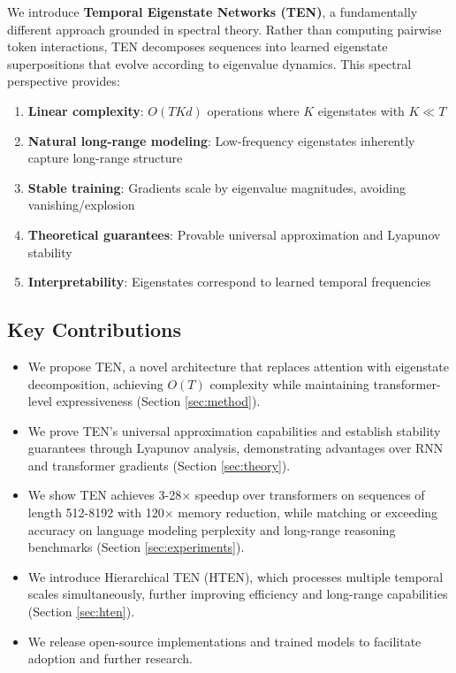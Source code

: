 \documentclass[11pt,letterpaper]{article}
\begin{document}
We introduce \textbf{Temporal Eigenstate Networks (TEN)}, a fundamentally different approach grounded in spectral theory. Rather than computing pairwise token interactions, TEN decomposes sequences into learned eigenstate superpositions that evolve according to eigenvalue dynamics. This spectral perspective provides:

\begin{enumerate}
    \item \textbf{Linear complexity}: $O(TKd)$ operations where $K$ eigenstates with $K \ll T$
    \item \textbf{Natural long-range modeling}: Low-frequency eigenstates inherently capture long-range structure
    \item \textbf{Stable training}: Gradients scale by eigenvalue magnitudes, avoiding vanishing/explosion
    \item \textbf{Theoretical guarantees}: Provable universal approximation and Lyapunov stability
    \item \textbf{Interpretability}: Eigenstates correspond to learned temporal frequencies
\end{enumerate}

\subsection{Key Contributions}

\begin{itemize}
    \item We propose TEN, a novel architecture that replaces attention with eigenstate decomposition, achieving $O(T)$ complexity while maintaining transformer-level expressiveness (Section \ref{sec:method}).
    
    \item We prove TEN's universal approximation capabilities and establish stability guarantees through Lyapunov analysis, demonstrating advantages over RNN and transformer gradients (Section \ref{sec:theory}).
    
    \item We show TEN achieves 3-28× speedup over transformers on sequences of length 512-8192 with 120× memory reduction, while matching or exceeding accuracy on language modeling perplexity and long-range reasoning benchmarks (Section \ref{sec:experiments}).
    
    \item We introduce Hierarchical TEN (HTEN), which processes multiple temporal scales simultaneously, further improving efficiency and long-range capabilities (Section \ref{sec:hten}).
    
    \item We release open-source implementations and trained models to facilitate adoption and further research.
\end{itemize}
\end{document}
